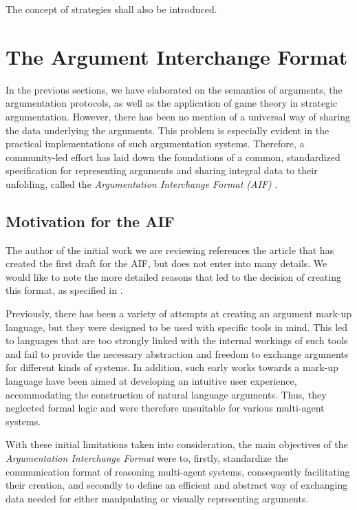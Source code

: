 \documentclass[12pt, a4paper]{article}
\begin{document}
The concept of strategies shall also be introduced. 







\newpage

\section{The Argument Interchange Format}
In the previous sections, we have elaborated on the semantics of arguments, the argumentation protocols, as well as the application of game theory in strategic argumentation. However, there has been no mention of a universal way of sharing the data underlying the arguments. This problem is especially evident in the practical implementations of such argumentation systems. Therefore, a community-led effort has laid down the foundations of a common, standardized specification for representing arguments and sharing integral data to their unfolding, called the \emph{Argumentation Interchange Format (AIF)} \cite{aif}.

\subsection{Motivation for the AIF}
The author of the initial work we are reviewing references the article that has created the first draft for the AIF, but does not enter into many details. We would like to note the more detailed reasons that led to the decision of creating this format, as specified in \cite{aif}.

Previously, there has been a variety of attempts at creating an argument mark-up language, but they were designed to be used with specific tools in mind. This led to languages that are too strongly linked with the internal workings of such tools and fail to provide the necessary abstraction and freedom to exchange arguments for different kinds of systems. In addition, such early works towards a mark-up language have been aimed at developing an intuitive user experience, accommodating the construction of natural language arguments. Thus, they neglected formal logic and were therefore unsuitable for various multi-agent systems.

With these initial limitations taken into consideration, the main objectives of the \emph{Argumentation Interchange Format} were to, firstly, standardize the communication format of reasoning multi-agent systems, consequently facilitating their creation, and secondly to define an efficient and abstract way of exchanging data needed for either manipulating or visually representing arguments.
\end{document}
